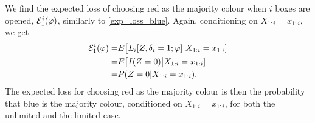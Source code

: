 We find the expected loss of choosing red as the majority colour when $i$ boxes are opened, $\mathcal{E}^i_{1}(\varphi)$, similarly to \eqref{exp_loss_blue}. Again, conditioning on $X_{1:i}=x_{1:i}$, we get
\begin{equation}
\label{exp_loss_red}
    \begin{aligned}
        \mathcal{E}^i_{1}(\varphi) 
        = &E\big[ L_i[Z,\delta_i=1;\varphi] \big |X_{1:i}=x_{1:i} ]\\
        = & E \big[ I(Z=0) \big|X_{1:i}=x_{1:i}]\\
        = & P(Z=0|X_{1:i}=x_{1:i}).
    \end{aligned}
\end{equation}
The expected loss for choosing red as the majority colour is then the probability that blue is the majority colour, conditioned on $X_{1:i}=x_{1:i}$, for both the unlimited and the limited case.

